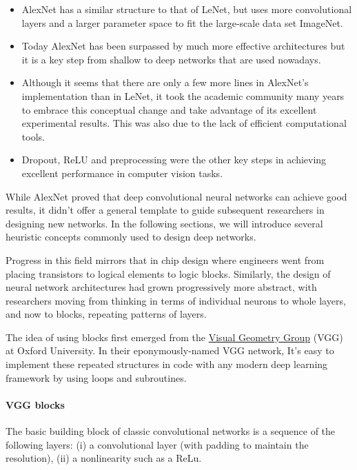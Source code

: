 \begin{itemize}
    \item AlexNet has a similar structure to that of LeNet, but uses more convolutional layers and a larger parameter space to fit the large-scale data set ImageNet.
    \item Today AlexNet has been surpassed by much more effective architectures but it is a key step from shallow to deep networks that are used nowadays.
    \item Although it seems that there are only a few more lines in AlexNet's implementation than in LeNet, it took the academic community many years to embrace this conceptual change and take advantage of its excellent experimental results. This was also due to the lack of efficient computational tools.
    \item Dropout, ReLU and preprocessing were the other key steps in achieving excellent performance in computer vision tasks.
\end{itemize}

\label{cnn:vgg}

While AlexNet proved that deep convolutional neural networks can achieve good results, it didn't offer a general template to guide subsequent researchers in designing new networks.  In the following sections, we will introduce several heuristic concepts commonly used to design deep networks.

Progress in this field mirrors that in chip design where engineers went from placing transistors to logical elements to logic blocks. Similarly, the design of neural network architectures  had grown progressively more abstract, with researchers moving from thinking in terms of individual neurons to whole layers, and now to blocks, repeating patterns of layers.

The idea of using blocks first emerged from the \href{http://www.robots.ox.ac.uk/~vgg/}{Visual Geometry Group} (VGG) at Oxford University. In their eponymously-named VGG network, It's easy to implement these repeated structures in code with any modern deep learning framework by using loops and subroutines. 

\paragraph{VGG blocks}

The basic building block of classic convolutional networks is a sequence of the following layers: (i) a convolutional layer  (with padding to maintain the resolution), (ii) a nonlinearity such as a ReLu.

